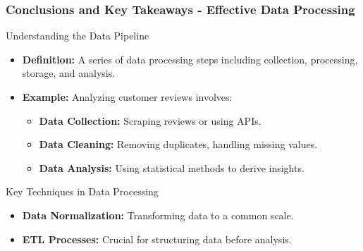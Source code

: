 \documentclass[aspectratio=169]{beamer}
\begin{document}
\begin{frame}[fragile]
    \frametitle{Conclusions and Key Takeaways - Effective Data Processing}
    
    \begin{block}{Understanding the Data Pipeline}
        \begin{itemize}
            \item \textbf{Definition:} A series of data processing steps including collection, processing, storage, and analysis.
            \item \textbf{Example:} Analyzing customer reviews involves:
            \begin{itemize}
                \item \textbf{Data Collection:} Scraping reviews or using APIs.
                \item \textbf{Data Cleaning:} Removing duplicates, handling missing values.
                \item \textbf{Data Analysis:} Using statistical methods to derive insights.
            \end{itemize}
        \end{itemize}
    \end{block}
    
    \begin{block}{Key Techniques in Data Processing}
        \begin{itemize}
            \item \textbf{Data Normalization:} Transforming data to a common scale.
            \item \textbf{ETL Processes:} Crucial for structuring data before analysis.
        \end{itemize}
    \end{block}
\end{frame}
\end{document}
